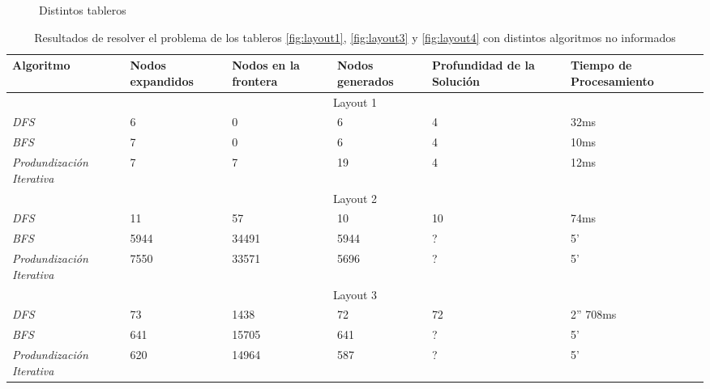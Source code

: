 \documentclass{sig-alternate}
\begin{document}
\begin{figure}[h!]
\begin{center}
  \end{center}
  \caption{Distintos tableros}
  \label{fig:layouts}
\end{figure}
	
	
\begin{table}[h]
\begin{center}
	\begin{tabular}{|p{2.3cm}|p{2cm}|p{2cm}|p{2cm}|p{2cm}|p{4cm}|}
	\hline
	 Algoritmo & Nodos expandidos & Nodos en la frontera & Nodos generados & Profundidad de la Soluci\'on & Tiempo de Procesamiento\\
	\hline \hline
		 \multicolumn{6}{|c|}{Layout 1} \\
	\hline
	\textit{DFS} & 6 & 0 & 6 & 4 & 32ms \\
	\textit{BFS} & 7 & 0 & 6 & 4 & 10ms \\
	\textit{Produndizaci\'on Iterativa} & 7 & 7 & 19 & 4 & 12ms \\
	\hline
		 \multicolumn{6}{|c|}{Layout 2} \\
	\hline
	\textit{DFS} & 11 & 57 & 10 & 10 & 74ms \\
	\textit{BFS} &5944 & 34491 & 5944 & ? & 5' \\
	\textit{Produndizaci\'on Iterativa} & 7550 & 33571 & 5696 & ? & 5' \\
	\hline
		 \multicolumn{6}{|c|}{Layout 3} \\
	\hline
	\textit{DFS} & 73 & 1438 & 72 & 72 & 2'' 708ms \\
	\textit{BFS} & 641 & 15705 & 641 & ? & 5' \\
	\textit{Produndizaci\'on Iterativa} & 620 & 14964 & 587 & ? & 5' \\
	\hline
	\end{tabular}
\end{center}
\caption{Resultados de resolver el problema de los tableros \ref{fig:layout1}, \ref{fig:layout3} y \ref{fig:layout4} con distintos algoritmos no informados}
\label{tab:cost}
\end{table}
\end{document}
